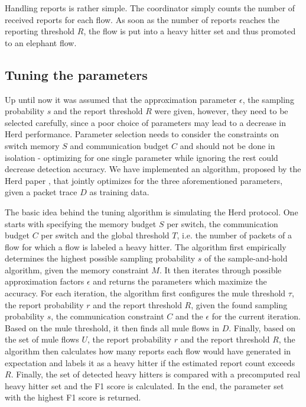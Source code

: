 \documentclass[11pt,oneside,a4paper]{article}
\begin{document}
Handling reports is rather simple. The coordinator simply counts the number of received reports for each flow. As soon as the number of reports reaches the reporting threshold $R$, the flow is put into a heavy hitter set and thus promoted to an elephant flow.

\subsection{Tuning the parameters} \label{tuningparameters}


Up until now it was assumed that the approximation parameter $\epsilon$, the sampling probability $s$ and the report threshold $R$ were given, however, they need to be selected carefully, since a poor choice of parameters may lead to a decrease in Herd performance. Parameter selection needs to consider the constraints on switch memory $S$ and communication budget $C$ and should not be done in isolation - optimizing for one single parameter while ignoring the rest could decrease detection accuracy. We have implemented an algorithm, proposed by the Herd paper \cite{anon2019herd}, that jointly optimizes for the three aforementioned parameters, given a packet trace $D$ as training data.

The basic idea behind the tuning algorithm is simulating the Herd protocol. One starts with specifying the memory budget $S$ per switch, the communication budget $C$ per switch and the global threshold $T$, i.e. the number of packets of a flow for which a flow is labeled a heavy hitter. The algorithm first empirically determines the highest possible sampling probability $s$ of the sample-and-hold algorithm, given the memory constraint $M$. It then iterates through possible approximation factors $\epsilon$ and returns the parameters which maximize the accuracy. For each iteration, the algorithm first configures the mule threshold $\tau$, the report probability $r$ and the report threshold $R$, given the found sampling probability $s$, the communication constraint $C$ and the $\epsilon$ for the current iteration. Based on the mule threshold, it then finds all mule flows in $D$. Finally, based on the set of mule flows $U$, the report probability $r$ and the report threshold $R$, the algorithm then calculates how many reports each flow would have generated in expectation and labels it as a heavy hitter if the estimated report count exceeds $R$. Finally, the set of detected heavy hitters is compared with a precomputed real heavy hitter set and the F1 score is calculated. In the end, the parameter set with the highest F1 score is returned.
\end{document}
